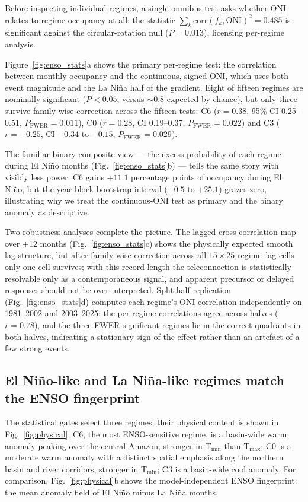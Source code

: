 \documentclass[pdflatex,sn-nature]{sn-jnl}
\begin{document}
Before inspecting individual regimes, a single omnibus test asks whether ONI relates to regime occupancy at all: the statistic $\sum_k \mathrm{corr}(f_k, \mathrm{ONI})^2 = 0.485$ is significant against the circular-rotation null ($P = 0.013$), licensing per-regime analysis.

Figure~\ref{fig:enso_stats}a shows the primary per-regime test: the correlation between monthly occupancy and the continuous, signed ONI, which uses both event magnitude and the La Ni\~na half of the gradient. Eight of fifteen regimes are nominally significant ($P < 0.05$, versus $\sim$0.8 expected by chance), but only three survive family-wise correction across the fifteen tests: C6 ($r = 0.38$, 95\% CI 0.25--0.51, $P_{\mathrm{FWER}} = 0.011$), C0 ($r = 0.28$, CI 0.19--0.37, $P_{\mathrm{FWER}} = 0.022$) and C3 ($r = -0.25$, CI $-0.34$ to $-0.15$, $P_{\mathrm{FWER}} = 0.029$).

The familiar binary composite view --- the excess probability of each regime during El Ni\~no months (Fig.~\ref{fig:enso_stats}b) --- tells the same story with visibly less power: C6 gains $+11.1$ percentage points of occupancy during El Ni\~no, but the year-block bootstrap interval ($-0.5$ to $+25.1$) grazes zero, illustrating why we treat the continuous-ONI test as primary and the binary anomaly as descriptive.

Two robustness analyses complete the picture. The lagged cross-correlation map over $\pm$12 months (Fig.~\ref{fig:enso_stats}c) shows the physically expected smooth lag structure, but after family-wise correction across all $15 \times 25$ regime--lag cells only one cell survives; with this record length the teleconnection is statistically resolvable only as a contemporaneous signal, and apparent precursor or delayed responses should not be over-interpreted. Split-half replication (Fig.~\ref{fig:enso_stats}d) computes each regime's ONI correlation independently on 1981--2002 and 2003--2025: the per-regime correlations agree across halves ($r = 0.78$), and the three FWER-significant regimes lie in the correct quadrants in both halves, indicating a stationary sign of the effect rather than an artefact of a few strong events.

\subsection{El Ni\~no-like and La Ni\~na-like regimes match the ENSO fingerprint}\label{sec:physical}

The statistical gates select three regimes; their physical content is shown in Fig.~\ref{fig:physical}. C6, the most ENSO-sensitive regime, is a basin-wide warm anomaly peaking over the central Amazon, stronger in T$_{\min}$ than T$_{\max}$; C0 is a moderate warm anomaly with a distinct spatial emphasis along the northern basin and river corridors, stronger in T$_{\min}$; C3 is a basin-wide cool anomaly. For comparison, Fig.~\ref{fig:physical}b shows the model-independent ENSO fingerprint: the mean anomaly field of El Ni\~no minus La Ni\~na months.
\end{document}
